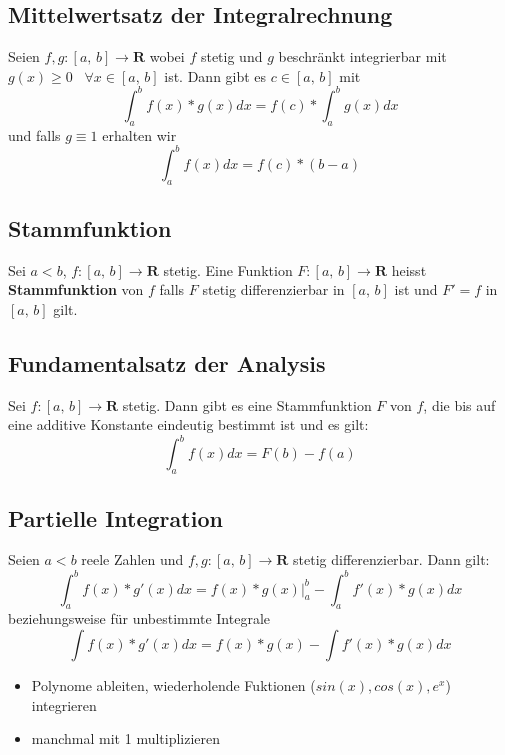 \documentclass[8pt]{extarticle}
\begin{document}
\begin{multicols*}{3}
\subsection{Mittelwertsatz der Integralrechnung}

Seien $f,g:[a,\,b] \rightarrow \mathbf{R}$ wobei $f$ stetig und $g$ beschränkt integrierbar mit $g(x) \geq 0 \;\;\; \forall x \in [a,\,b]$ ist.
Dann gibt es $c \in [a,\,b]$ mit $$\int_a^b f(x) * g(x) dx = f(c) * \int_a^b g(x) dx$$
und falls $g \equiv 1$ erhalten wir $$\int_a^b f(x) dx = f(c) * (b - a)$$

\subsection{Stammfunktion}

Sei $a < b$, $f:[a,\,b] \rightarrow \mathbf{R}$ stetig. Eine Funktion $F:[a,\,b] \rightarrow \mathbf{R}$ heisst
\textbf{Stammfunktion} von $f$ falls $F$ stetig differenzierbar in $[a,\, b]$ ist und $F' = f$ in $[a,\,b]$ gilt.

\subsection{Fundamentalsatz der Analysis}

Sei $f:[a,\,b] \rightarrow \mathbf{R}$ stetig. Dann gibt es eine Stammfunktion $F$ von $f$, die bis auf eine additive Konstante eindeutig bestimmt ist und es gilt:
$$\int_a^b f(x) dx = F(b) - f(a)$$


\subsection{Partielle Integration}

Seien $a < b$ reele Zahlen und $f,g:[a,\,b] \rightarrow \mathbf{R}$ stetig differenzierbar.
Dann gilt:
$$
  \int_a^b f(x) * g'(x) dx = f(x) * g(x) \Big|_a^b - \int_a^b f'(x) * g(x) dx
$$
beziehungsweise für unbestimmte Integrale
$$
\int f(x) * g'(x) dx = f(x) * g(x) - \int f'(x) * g(x) dx
$$

\begin{itemize}
\item Polynome ableiten, wiederholende Fuktionen ($sin(x), cos(x), e^x$) integrieren
\item manchmal mit 1 multiplizieren
\end{itemize}


\end{multicols*}
\end{document}
